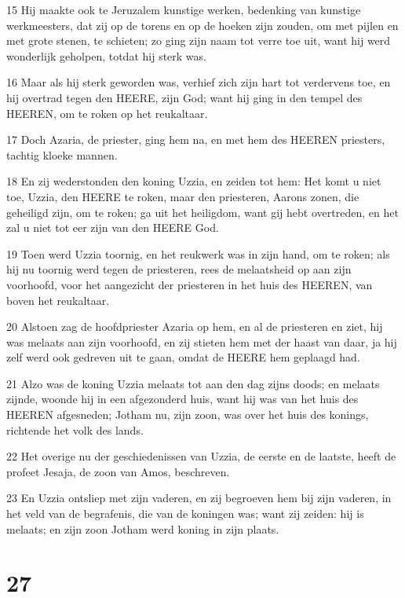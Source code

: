 \par 15 Hij maakte ook te Jeruzalem kunstige werken, bedenking van kunstige werkmeesters, dat zij op de torens en op de hoeken zijn zouden, om met pijlen en met grote stenen, te schieten; zo ging zijn naam tot verre toe uit, want hij werd wonderlijk geholpen, totdat hij sterk was.
\par 16 Maar als hij sterk geworden was, verhief zich zijn hart tot verdervens toe, en hij overtrad tegen den HEERE, zijn God; want hij ging in den tempel des HEEREN, om te roken op het reukaltaar.
\par 17 Doch Azaria, de priester, ging hem na, en met hem des HEEREN priesters, tachtig kloeke mannen.
\par 18 En zij wederstonden den koning Uzzia, en zeiden tot hem: Het komt u niet toe, Uzzia, den HEERE te roken, maar den priesteren, Aarons zonen, die geheiligd zijn, om te roken; ga uit het heiligdom, want gij hebt overtreden, en het zal u niet tot eer zijn van den HEERE God.
\par 19 Toen werd Uzzia toornig, en het reukwerk was in zijn hand, om te roken; als hij nu toornig werd tegen de priesteren, rees de melaatsheid op aan zijn voorhoofd, voor het aangezicht der priesteren in het huis des HEEREN, van boven het reukaltaar.
\par 20 Alstoen zag de hoofdpriester Azaria op hem, en al de priesteren en ziet, hij was melaats aan zijn voorhoofd, en zij stieten hem met der haast van daar, ja hij zelf werd ook gedreven uit te gaan, omdat de HEERE hem geplaagd had.
\par 21 Alzo was de koning Uzzia melaats tot aan den dag zijns doods; en melaats zijnde, woonde hij in een afgezonderd huis, want hij was van het huis des HEEREN afgesneden; Jotham nu, zijn zoon, was over het huis des konings, richtende het volk des lands.
\par 22 Het overige nu der geschiedenissen van Uzzia, de eerste en de laatste, heeft de profeet Jesaja, de zoon van Amos, beschreven.
\par 23 En Uzzia ontsliep met zijn vaderen, en zij begroeven hem bij zijn vaderen, in het veld van de begrafenis, die van de koningen was; want zij zeiden: hij is melaats; en zijn zoon Jotham werd koning in zijn plaats.

\chapter{27}

